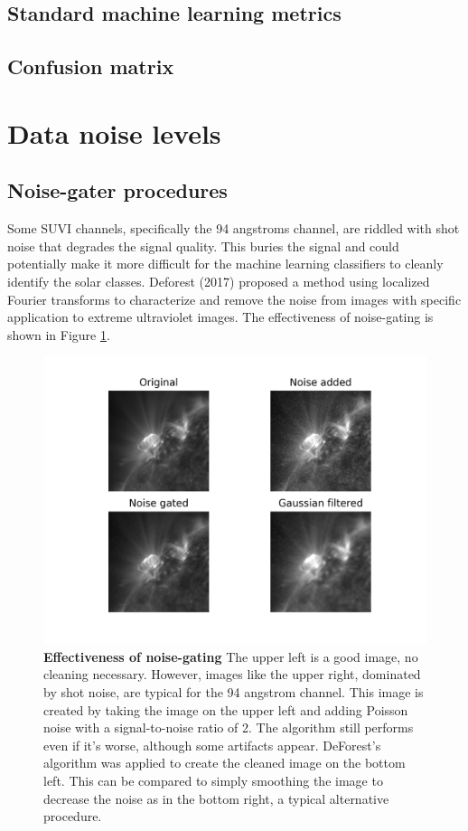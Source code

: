\documentclass[twoside]{report}
\begin{document}
\subsection{Standard machine learning metrics}

\subsection{Confusion matrix}

\section{Data noise levels}

\subsection{Noise-gater procedures}
Some SUVI channels, specifically the 94 angstroms channel, are riddled with shot noise that degrades the signal quality. This buries the signal and could potentially make it more difficult for the machine learning classifiers to cleanly identify the solar classes. Deforest (2017) proposed a method using localized Fourier transforms to characterize and remove the noise from images with specific application to extreme ultraviolet images. The effectiveness of noise-gating is shown in Figure \ref{fig:noise-gate-example}.


\begin{figure}[ht]
  \begin{center}
    \includegraphics[scale=0.8]{noise-gate.png}
    \caption{{\bf Effectiveness of noise-gating} The upper left is a good image, no cleaning necessary. However, images like the upper right, dominated by shot noise, are typical for the 94 angstrom channel. This image is created by taking the image on the upper left and adding Poisson noise with a signal-to-noise ratio of 2. The algorithm still performs even if it's worse, although some artifacts appear. DeForest's algorithm was applied to create the cleaned image on the bottom left. This can be compared to simply smoothing the image to decrease the noise as in the bottom right, a typical alternative procedure.}
    \label{fig:noise-gate-example}
 \end{center}
\end{figure}
\end{document}
